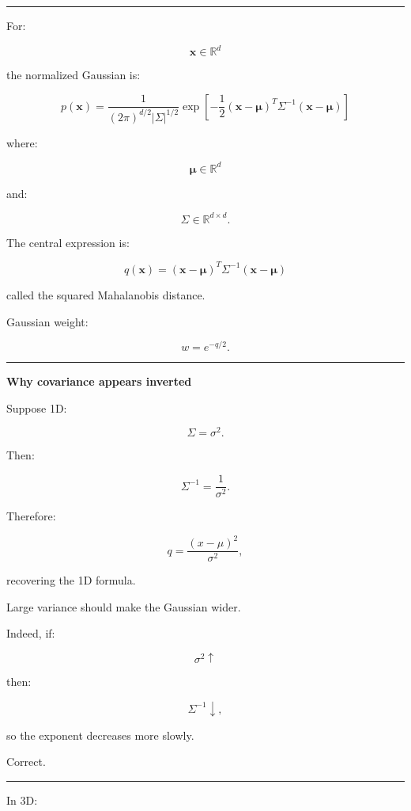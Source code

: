 \begin{center}\rule{0.5\linewidth}{0.5pt}\end{center}

For:

\[
\mathbf x\in\mathbb R^d
\]

the normalized Gaussian is:

\[
\boxed{
p(\mathbf x)
=
\frac{
1
}{
(2\pi)^{d/2}
|\Sigma|^{1/2}
}
\exp
\left[
-\frac12
(\mathbf x-\boldsymbol\mu)^T
\Sigma^{-1}
(\mathbf x-\boldsymbol\mu)
\right]
}
\]

where:

\[
\boldsymbol\mu\in\mathbb R^d
\]

and:

\[
\Sigma\in\mathbb R^{d\times d}.
\]

The central expression is:

\[
\boxed{
q(\mathbf x)
=
(\mathbf x-\boldsymbol\mu)^T
\Sigma^{-1}
(\mathbf x-\boldsymbol\mu)
}
\]

called the squared Mahalanobis distance.

Gaussian weight:

\[
w=e^{-q/2}.
\]

\begin{center}\rule{0.5\linewidth}{0.5pt}\end{center}

\textbf{Why covariance appears inverted}

Suppose 1D:

\[
\Sigma=\sigma^2.
\]

Then:

\[
\Sigma^{-1}
=
\frac1{\sigma^2}.
\]

Therefore:

\[
q=
\frac{(x-\mu)^2}{\sigma^2},
\]

recovering the 1D formula.

Large variance should make the Gaussian wider.

Indeed, if:

\[
\sigma^2\uparrow
\]

then:

\[
\Sigma^{-1}\downarrow,
\]

so the exponent decreases more slowly.

Correct.

\begin{center}\rule{0.5\linewidth}{0.5pt}\end{center}

In 3D:

